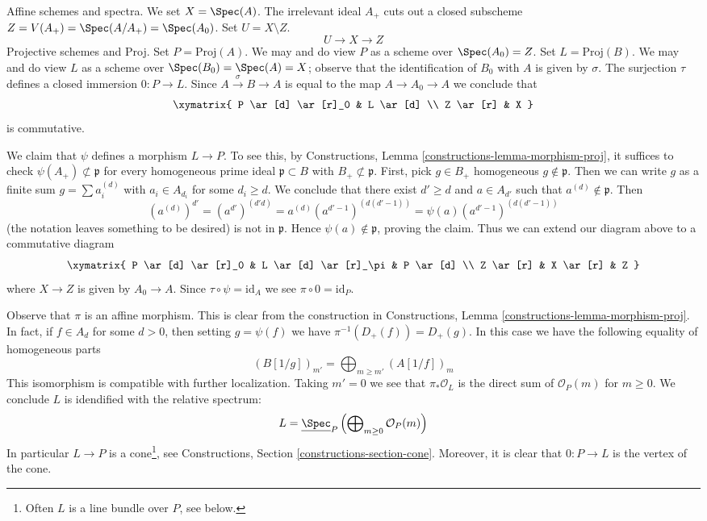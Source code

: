 \medskip\noindent
Affine schemes and spectra.
We set $X = \Spec(A)$. The irrelevant ideal $A_+$ cuts out a closed subscheme
$Z = V(A_+) = \Spec(A/A_+) = \Spec(A_0)$. Set $U = X \setminus Z$.
$$
U \longrightarrow X \longrightarrow Z
$$
Projective schemes and Proj. Set $P = \text{Proj}(A)$. We may
and do view $P$ as a scheme over $\Spec(A_0) = Z$.
Set $L = \text{Proj}(B)$. We may and do view $L$ as a scheme
over $\Spec(B_0) = \Spec(A) = X$; observe that the identification
of $B_0$ with $A$ is given by $\sigma$.
The surjection $\tau$ defines a closed immersion $0 : P \to L$.
Since $A \xrightarrow{\sigma} B \to A$ is equal to the map $A \to A_0 \to A$
we conclude that
$$
\xymatrix{
P \ar[d] \ar[r]_0 & L \ar[d] \\
Z \ar[r] & X
}
$$
is commutative.

\medskip\noindent
We claim that $\psi$ defines a morphism $L \to P$.
To see this, by Constructions, Lemma \ref{constructions-lemma-morphism-proj},
it suffices to check $\psi(A_+) \not \subset \mathfrak p$ for
every homogeneous prime ideal
$\mathfrak p \subset B$ with $B_+ \not \subset \mathfrak p$.
First, pick $g \in B_+$ homogeneous $g \not \in \mathfrak p$.
Then we can write $g$ as a finite sum $g = \sum a_i^{(d)}$
with $a_i \in A_{d_i}$ for some $d_i \geq d$.
We conclude that there exist $d' \geq d$ and $a \in A_{d'}$
such that $a^{(d)} \not \in \mathfrak p$.
Then
$$
(a^{(d)})^{d'} =
(a^{d'})^{(d'd)} =
a^{(d)} (a^{d' - 1})^{(d(d' - 1))} =
\psi(a) (a^{d' - 1})^{(d(d' - 1))}
$$
(the notation leaves something to be desired) is not in $\mathfrak p$.
Hence $\psi(a) \not \in \mathfrak p$, proving the claim.
Thus we can extend our diagram above to a commutative diagram
$$
\xymatrix{
P \ar[d] \ar[r]_0 & L \ar[d] \ar[r]_\pi & P \ar[d] \\
Z \ar[r] & X \ar[r] & Z
}
$$
where $X \to Z$ is given by $A_0 \to A$.
Since $\tau \circ \psi = \text{id}_A$ we see $\pi \circ 0 = \text{id}_P$.

\medskip\noindent
Observe that $\pi$ is an affine morphism. This is clear from the construction
in Constructions, Lemma \ref{constructions-lemma-morphism-proj}. In fact, if
$f \in A_d$ for some $d > 0$, then
setting $g = \psi(f)$ we have $\pi^{-1}(D_+(f)) = D_+(g)$.
In this case we have the following equality of homogeneous parts
$$
(B[1/g])_{m'} = \bigoplus\nolimits_{m \geq m'} (A[1/f])_m
$$
This isomorphism is compatible with further localization.
Taking $m' = 0$ we see that $\pi_*\mathcal{O}_L$ is the
direct sum of $\mathcal{O}_P(m)$ for $m \geq 0$. We conclude
$L$ is idendified with the relative spectrum:
$$
L = \underline{\Spec}_P
\left(
\bigoplus\nolimits_{m \geq 0} \mathcal{O}_P(m)
\right)
$$
In particular $L \to P$ is a cone\footnote{Often $L$ is a line bundle
over $P$, see below.}, see
Constructions, Section \ref{constructions-section-cone}.
Moreover, it is clear that $0 : P \to L$ is the vertex of the cone.

